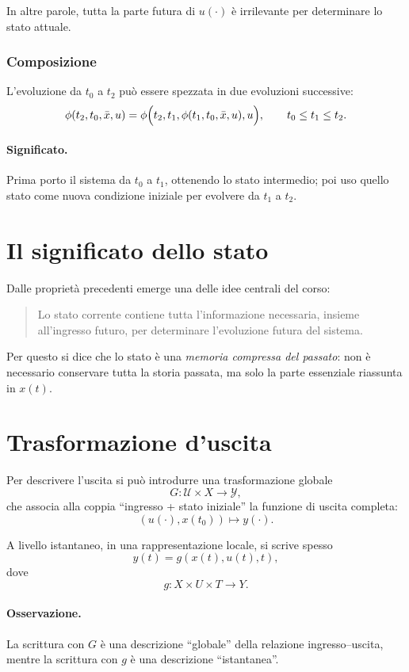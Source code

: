 In altre parole, tutta la parte futura di $u(\cdot)$ è irrilevante per determinare lo stato attuale.

\subsubsection{Composizione}

L'evoluzione da $t_0$ a $t_2$ può essere spezzata in due evoluzioni successive:
\[
\phi(t_2,t_0,\bar x,u)
=
\phi\Bigl(t_2,t_1,\phi(t_1,t_0,\bar x,u),u\Bigr),
\qquad t_0\le t_1\le t_2.
\]

\paragraph{Significato.}
Prima porto il sistema da $t_0$ a $t_1$, ottenendo lo stato intermedio; poi uso quello stato come nuova condizione iniziale per evolvere da $t_1$ a $t_2$.

\section{Il significato dello stato}

Dalle proprietà precedenti emerge una delle idee centrali del corso:

\begin{quote}
Lo stato corrente contiene tutta l'informazione necessaria, insieme all'ingresso futuro, per determinare l'evoluzione futura del sistema.
\end{quote}

Per questo si dice che lo stato è una \emph{memoria compressa del passato}: non è necessario conservare tutta la storia passata, ma solo la parte essenziale riassunta in $x(t)$.

\section{Trasformazione d'uscita}

Per descrivere l'uscita si può introdurre una trasformazione globale
\[
G:\mathcal{U}\times X\to \mathcal{Y},
\]
che associa alla coppia ``ingresso + stato iniziale'' la funzione di uscita completa:
\[
(u(\cdot),x(t_0)) \mapsto y(\cdot).
\]

A livello istantaneo, in una rappresentazione locale, si scrive spesso
\[
y(t)=g(x(t),u(t),t),
\]
dove
\[
g:X\times U\times T \to Y.
\]

\paragraph{Osservazione.}
La scrittura con $G$ è una descrizione ``globale'' della relazione ingresso--uscita, mentre la scrittura con $g$ è una descrizione ``istantanea''.


